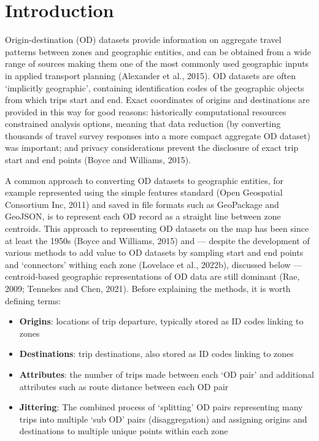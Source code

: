 \documentclass{isprs} %
\begin{document}
\hypertarget{introduction}{%
\section{Introduction}\label{introduction}}

Origin-destination (OD) datasets provide information on aggregate travel patterns between zones and geographic entities, and can be obtained from a wide range of sources making them one of the most commonly used geographic inputs in applied transport planning (Alexander et al., 2015).
OD datasets are often `implicitly geographic', containing identification codes of the geographic objects from which trips start and end.
Exact coordinates of origins and destinations are provided in this way for good reasons: historically computational resources constrained analysis options, meaning that data reduction (by converting thousands of travel survey responses into a more compact aggregate OD dataset) was important; and privacy considerations prevent the disclosure of exact trip start and end points (Boyce and Williams, 2015).

A common approach to converting OD datasets to geographic entities, for example represented using the simple features standard (Open Geospatial Consortium Inc, 2011) and saved in file formats such as GeoPackage and GeoJSON, is to represent each OD record as a straight line between zone centroids.
This approach to representing OD datasets on the map has been since at least the 1950s (Boyce and Williams, 2015) and --- despite the development of various methods to add value to OD datasets by sampling start and end points and `connectors' withing each zone (Lovelace et al., 2022b), discussed below --- centroid-based geographic representations of OD data are still dominant (Rae, 2009; Tennekes and Chen, 2021).
Before explaining the methods, it is worth defining terms:

\begin{itemize}
\item
  \textbf{Origins}: locations of trip departure, typically stored as ID codes linking to zones
\item
  \textbf{Destinations}: trip destinations, also stored as ID codes linking to zones
\item
  \textbf{Attributes}: the number of trips made between each `OD pair' and additional attributes such as route distance between each OD pair
\item
  \textbf{Jittering}: The combined process of `splitting' OD pairs representing many trips into multiple `sub OD' pairs (disaggregation) and assigning origins and destinations to multiple unique points within each zone
\end{itemize}
\end{document}
